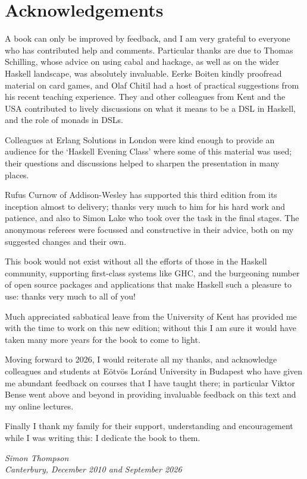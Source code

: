 \section*{Acknowledgements}

A book can only be improved by feedback, and I am very grateful to everyone who has contributed help and comments. Particular thanks are due to Thomas Schilling, whose advice on using cabal and hackage, as well as on the wider Haskell landscape, was absolutely invaluable. Eerke Boiten kindly proofread material on card games, and Olaf Chitil had a host of practical suggestions from his recent teaching experience. They and other colleagues from Kent and the USA contributed to lively discussions on what it means to be a DSL in Haskell, and the role of monads in DSLs. 

Colleagues at Erlang Solutions in London were kind enough to provide an audience for the  `Haskell Evening Class' where some of this material was used; their questions and discussions helped to sharpen the presentation in many places.

Rufus Curnow of Addison-Wesley
has supported this third edition from
its inception almost to delivery; thanks very much to him for his hard work and patience, and also to Simon Lake who took over the task in the final stages. The anonymous referees were focussed and constructive in their advice, both on my suggested changes and their own.

This book would not exist without all the efforts of those in the Haskell community, supporting first-class systems like GHC, and the burgeoning number of open source packages and applications that make Haskell such a pleasure to use: thanks very much to all of you!

Much appreciated sabbatical leave from the University of Kent has provided me with the time to work on this new edition; without this I am sure it would have taken many more years for the book to come to light.

Moving forward to 2026, I would reiterate all my thanks, and acknowledge colleagues and students at E\"{o}tv\"{o}s Lor\'{a}nd University in Budapest who have given me abundant feedback on courses that I have taught there; in particular Viktor Bense went above and beyond in providing invaluable feedback on this text and my online lectures.

Finally I thank my family for their support, understanding and encouragement while I was writing this: I dedicate the book to them.


{\raggedleft
\bigskip
\noindent
\emph{Simon Thompson}\\
\emph{Canterbury, December 2010 and September 2026}\\
}

%
